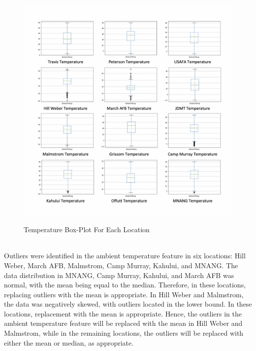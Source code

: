 \documentclass{report}
\begin{document}
\begin{figure}[h!]
    \centering
    \includegraphics[width=12cm, height=12cm]{3333.png}
    \caption{Temperature Box-Plot For Each Location}
\end{figure}\newpage \hfill \break 
\\
Outliers were identified in the ambient temperature feature in six locations: Hill Weber, March AFB, Malmstrom, Camp Murray, Kahului, and MNANG. The data distribution in MNANG, Camp Murray, Kahului, and March AFB was normal, with the mean being equal to the median. Therefore, in these locations, replacing outliers with the mean is appropriate. In Hill Weber and Malmstrom, the data was negatively skewed, with outliers located in the lower bound. In these locations, replacement with the mean is appropriate. Hence, the outliers in the ambient temperature feature will be replaced with the mean in Hill Weber and Malmstrom, while in the remaining locations, the outliers will be replaced with either the mean or median, as appropriate.
\end{document}
